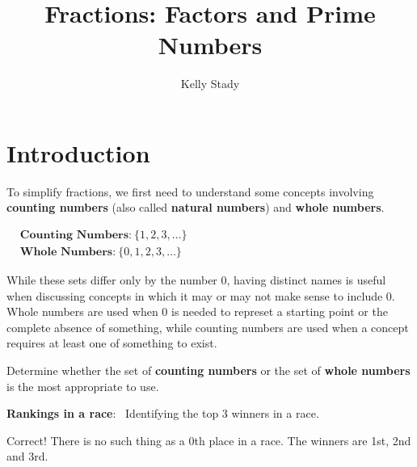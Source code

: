 \documentclass{ximera}[font=12pt]  %
\title{Fractions: Factors and Prime Numbers}   %
\author{Kelly Stady}
\begin{document}
\begin{abstract}

\end{abstract}

\maketitle

\label{xim:FactorsPrime}

\section*{Introduction}

To simplify fractions, we first need to understand some concepts involving \textbf{counting numbers} (also called \textbf{natural numbers}) 
and \textbf{whole numbers}.


\begin{flushleft}
\hspace{5em} %
$\begin{aligned}
& \textbf{Counting Numbers:} \ \{1, 2, 3, \dots\} \\[1.5ex]
& \textbf{Whole Numbers:} \ \{0, 1, 2, 3, \dots\}
\end{aligned}$
\end{flushleft}


While these sets differ only by the number 0, having distinct names is useful when discussing concepts in which it may or
may not make sense to include 0.  Whole numbers are used when 0 is needed to represet a starting point or the complete absence of something, 
while counting numbers are used when a concept requires at least one of something to exist.  


\begin{problem}  
Determine whether the set of \textbf{counting numbers} or the set of \textbf{whole numbers} is the most appropriate to use.

    \begin{center}
        \textbf{Rankings in a race}: \ Identifying the top 3 winners in a race.
    \end{center}

\begin{multipleChoice}
\end{multipleChoice}
\begin{feedback}
    Correct! There is no such thing as a 0th place in a race. The winners are 1st, 2nd and 3rd.
\end{feedback}
\end{problem}
\end{document}
